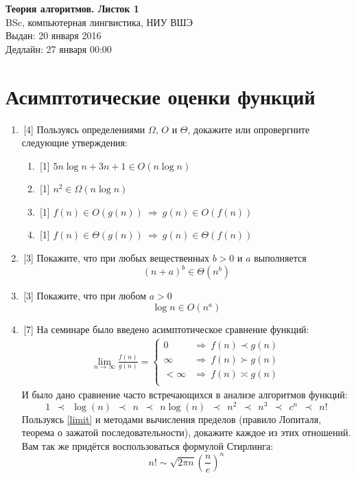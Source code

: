 \documentclass[12pt,a4paper]{report}
\begin{document}
\begin{center}
\textbf{\LARGE{Теория алгоритмов. Листок 1}}\\
BSc, компьютерная лингвистика, НИУ ВШЭ\\
Выдан: 20 января 2016\\
Дедлайн: 27 января 00:00\\
\end{center}


\section{Асимптотические оценки функций}

\begin{enumerate}

  \item\,[4] Пользуясь определениями $\Omega$, $O$ и $\Theta$, докажите или опровергните следующие утверждения:
    \begin{enumerate}
      \item\,[1] $5n\log{n} + 3n + 1 \in O(n\log{n})$
      \item\,[1] $n^2 \in \Omega(n \log n)$
      \item\,[1] $f(n) \in O(g(n)) ~\Rightarrow~ g(n) \in O(f(n))$
      \item\,[1] $f(n) \in \Theta(g(n)) ~\Rightarrow~ g(n) \in \Theta(f(n))$
    \end{enumerate}

  \item\,[3] Покажите, что при любых вещественных $b > 0$ и $a$ выполняется
    $$
    (n+a)^b \in \Theta(n^b)
    $$

  \item\,[3] Покажите, что при любом $a > 0$
    $$
    \log n \in O(n^a)
    $$

  \item\,[7] На семинаре было введено асимптотическое сравнение функций:
    \begin{equation}
      \label{limit}
      \begin{gathered}
        \lim_{n\to\infty} \frac{f(n)}{g(n)} = 
        \begin{cases}
        0         &  \Rightarrow ~  f(n) \prec g(n) \\
        \infty    &  \Rightarrow ~  f(n) \succ g(n) \\
        < \infty  &  \Rightarrow ~  f(n) \asymp g(n) \\
        \end{cases}
      \end{gathered}
    \end{equation}
    И было дано сравнение часто встречающихся в анализе алгоритмов функций:
    $$1 ~~\prec~~ \log(n) ~~\prec~~ n ~~\prec~~ n\log(n) ~~\prec~~ n^2 ~~\prec~~ n^3 ~~\prec~~ c^n ~~\prec~~ n!$$%
    Пользуясь \eqref{limit} и методами вычисления пределов (правило Лопиталя, теорема о зажатой последовательности), докажите каждое из этих отношений. Вам так же придётся воспользоваться формулой Стирлинга:
    $$n! \sim \sqrt{2\pi n} \left(\frac{n}{e}\right)^n$$%

\end{enumerate}
\end{document}
